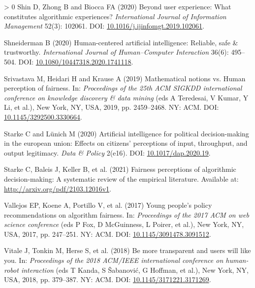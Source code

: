 \documentclass{article}
\newlength{\cslhangindent}
\newenvironment{CSLReferences}[3] %
 {%
  \setlength{\parindent}{0pt}
  \ifodd #1 \everypar{\setlength{\hangindent}{\cslhangindent}}\ignorespaces\fi
  \ifnum #2 > 0
  \setlength{\parskip}{#2\baselineskip}
  \fi
 }%
 {}
\begin{document}
\begin{CSLReferences}{1}{0}
\leavevmode\hypertarget{ref-Shin.2020b}{}%
Shin D, Zhong B and Biocca FA (2020) Beyond user experience: What
constitutes algorithmic experiences? \emph{International Journal of
Information Management} 52(3): 102061. DOI:
\href{https://doi.org/10.1016/j.ijinfomgt.2019.102061}{10.1016/j.ijinfomgt.2019.102061}.

\leavevmode\hypertarget{ref-Shneiderman.2020}{}%
Shneiderman B (2020) Human-centered artificial intelligence: Reliable,
safe {\&} trustworthy. \emph{International Journal of Human--Computer
Interaction} 36(6): 495--504. DOI:
\href{https://doi.org/10.1080/10447318.2020.1741118}{10.1080/10447318.2020.1741118}.

\leavevmode\hypertarget{ref-Srivastava.2019}{}%
Srivastava M, Heidari H and Krause A (2019) Mathematical notions vs.
Human perception of fairness. In: \emph{Proceedings of the 25th ACM
SIGKDD international conference on knowledge discovery {\&} data mining}
(eds A Teredesai, V Kumar, Y Li, et al.), New York, NY, USA, 2019, pp.
2459--2468. {NY: ACM}. DOI:
\href{https://doi.org/10.1145/3292500.3330664}{10.1145/3292500.3330664}.

\leavevmode\hypertarget{ref-Starke.2020}{}%
Starke C and Lünich M (2020) Artificial intelligence for political
decision-making in the european union: Effects on citizens' perceptions
of input, throughput, and output legitimacy. \emph{Data {\&} Policy}
2(e16). DOI:
\href{https://doi.org/10.1017/dap.2020.19}{10.1017/dap.2020.19}.

\leavevmode\hypertarget{ref-Starke.2021}{}%
Starke C, Baleis J, Keller B, et al. (2021) Fairness perceptions of
algorithmic decision-making: A systematic review of the empirical
literature. Available at: \url{http://arxiv.org/pdf/2103.12016v1}.

\leavevmode\hypertarget{ref-Vallejos.2017}{}%
Vallejos EP, Koene A, Portillo V, et al. (2017) Young people's policy
recommendations on algorithm fairness. In: \emph{Proceedings of the 2017
ACM on web science conference} (eds P Fox, D McGuinness, L Poirer, et
al.), New York, NY, USA, 2017, pp. 247--251. {NY: ACM}. DOI:
\href{https://doi.org/10.1145/3091478.3091512}{10.1145/3091478.3091512}.

\leavevmode\hypertarget{ref-Vitale.2018}{}%
Vitale J, Tonkin M, Herse S, et al. (2018) Be more transparent and users
will like you. In: \emph{Proceedings of the 2018 ACM/IEEE international
conference on human-robot interaction} (eds T Kanda, S Ŝabanović, G
Hoffman, et al.), New York, NY, USA, 2018, pp. 379--387. {NY: ACM}. DOI:
\href{https://doi.org/10.1145/3171221.3171269}{10.1145/3171221.3171269}.


\end{CSLReferences}
\end{document}
